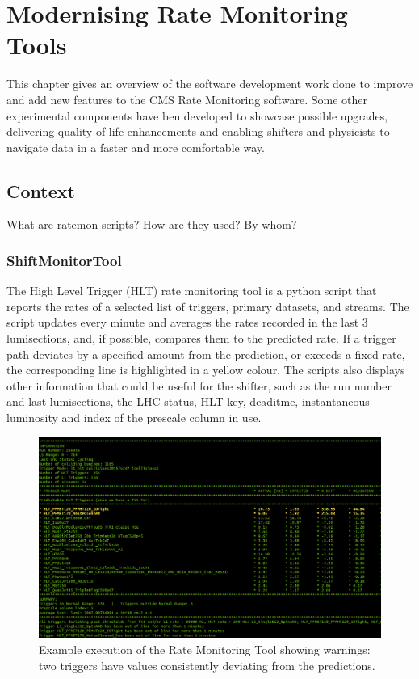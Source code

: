 \chapter{Modernising Rate Monitoring Tools}

This chapter gives an overview of the software development work done to improve and add new features to the CMS Rate Monitoring software. Some other experimental components have ben developed to showcase possible upgrades, delivering quality of life enhancements and enabling shifters and physicists to navigate data in a faster and more comfortable way.

\section{Context}

What are ratemon scripts? How are they used? By whom?

\subsection{ShiftMonitorTool}

The High Level Trigger (HLT) rate monitoring tool is a python script that reports the rates of a selected list of triggers, primary datasets, and streams. The script updates every minute and averages the rates recorded in the last 3 lumisections, and, if possible, compares them to the predicted rate. If a trigger path deviates by a specified amount from the prediction, or exceeds a fixed rate, the corresponding line is highlighted in a yellow colour. The scripts also displays other information that could be useful for the shifter, such as the run number and last lumisections, the LHC status, HLT key, deaditme, instantaneous luminosity and index of the prescale column in use.

\begin{figure}
	\centerline{
		\includegraphics[width=0.8\paperwidth]{figures/ratemon_warnings}}
	\caption{Example execution of the Rate Monitoring Tool showing warnings: two triggers have values consistently deviating from the predictions. \cite{ratemon-twiki}}
	\label{fig:ratemon_warnings}
\end{figure}

